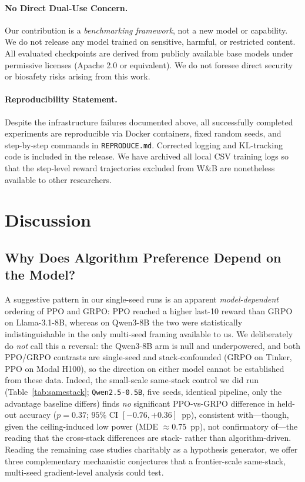 \documentclass{article}
\begin{document}
\paragraph{No Direct Dual-Use Concern.}
Our contribution is a \emph{benchmarking framework}, not a new model or
capability. We do not release any model trained on sensitive, harmful, or
restricted content. All evaluated checkpoints are derived from publicly
available base models under permissive licenses (Apache 2.0 or equivalent).
We do not foresee direct security or biosafety risks arising from this work.

\paragraph{Reproducibility Statement.}
Despite the infrastructure failures documented above, all successfully
completed experiments are reproducible via Docker containers, fixed random
seeds, and step-by-step commands in \texttt{REPRODUCE.md}. Corrected logging
and KL-tracking code is included in the release. We have archived all local
CSV training logs so that the step-level reward trajectories excluded from
W\&B are nonetheless available to other researchers.

\section{Discussion}
\label{sec:discussion}

\subsection{Why Does Algorithm Preference Depend on the Model?}
\label{sec:discuss_model_algo}

A suggestive pattern in our single-seed runs is an apparent \emph{model-dependent}
ordering of PPO and GRPO: PPO reached a higher last-10 reward than GRPO on
Llama-3.1-8B, whereas on Qwen3-8B the two were statistically indistinguishable in
the only multi-seed framing available to us. We deliberately do \emph{not} call
this a reversal: the Qwen3-8B arm is null and underpowered, and both PPO/GRPO
contrasts are single-seed and stack-confounded (GRPO on Tinker, PPO on Modal
H100), so the direction on either model cannot be established from these data.
Indeed, the small-scale same-stack control we did run (Table~\ref{tab:samestack};
\texttt{Qwen2.5-0.5B}, five seeds, identical pipeline, only the advantage
baseline differs) finds \emph{no} significant PPO-vs-GRPO difference in held-out
accuracy ($p{=}0.37$; $95\%$ CI $[-0.76,+0.36]$~pp), consistent with---though,
given the ceiling-induced low power (MDE $\approx 0.75$~pp), not confirmatory
of---the reading that the cross-stack differences are stack- rather than
algorithm-driven. Reading the remaining
case studies charitably as a hypothesis generator, we offer three complementary
mechanistic conjectures that a frontier-scale same-stack, multi-seed
gradient-level analysis could test.
\end{document}
